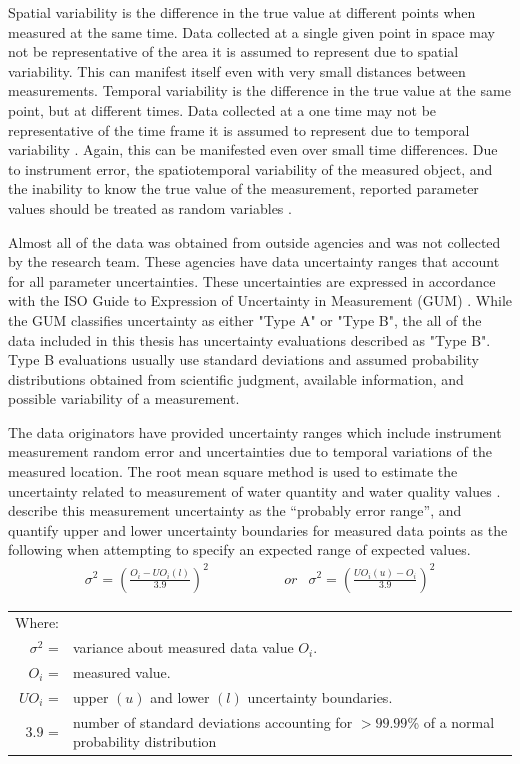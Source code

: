 \begin{linenumbers}
Spatial variability is the difference in the true value at different points when measured at the same time.  Data collected at a single given point in space may not be representative of the area it is assumed to represent due to spatial variability.  This can manifest itself even with very small distances between measurements.  Temporal variability is the difference in the true value at the same point, but at different times.  Data collected at a one time may not be representative of the time frame it is assumed to represent due to temporal variability \parencite{Gates1996}.  Again, this can be manifested even over small time differences.  Due to instrument error, the spatiotemporal variability of the measured object, and the inability to know the true value of the measurement, reported parameter values should be treated as random variables \parencite{haan1989,haan2002}.

Almost all of the data was obtained from outside agencies and was not collected by the research team.  These agencies have data uncertainty ranges that account for all parameter uncertainties.  These uncertainties are expressed in accordance with the ISO Guide to Expression of Uncertainty in Measurement (GUM) \parencite{gum2008}.  While the GUM classifies uncertainty as either "Type A" or "Type B", the all of the data included in this thesis has uncertainty evaluations described as "Type B".  Type B evaluations usually use standard deviations and assumed probability distributions obtained from scientific judgment, available information, and possible variability of a measurement.

The data originators have provided uncertainty ranges which include instrument measurement random error and uncertainties due to temporal variations of the measured location.  The root mean square method is used to estimate the uncertainty related to measurement of water quantity and water quality values \parencite{harmel2007, gum2008}.  \textcite{harmel2007} describe this measurement uncertainty as the “probably error range”, and quantify upper and lower uncertainty boundaries for measured data points as the following when attempting to specify an expected range of expected values.
\begin{align}
	\sigma^2 = \left( \frac{O_i-UO_{i}(l)}{3.9} \right)^2  &  \phantom{xxxxxxxx} or  & 	\sigma^2 = \left( \frac{UO_{i}(u)-O_i}{3.9} \right)^2 \label{eq:uncertainty1}
\end{align}
\begin{tabular}{r p{5in}}
	Where:\\
	$ \sigma^2 $ = & variance about measured data value $ O_i $.\\
	$ O_i $ = & measured value.\\
	$ UO_i $ = & upper $ (u) $ and lower $ (l) $ uncertainty boundaries.\\
	$ 3.9 $ = & number of standard deviations accounting for $ >99.99 $\% of a normal probability distribution
\end{tabular}\\


\end{linenumbers}
